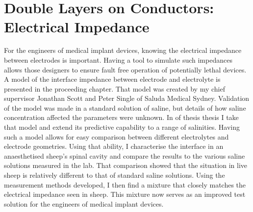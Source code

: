 %
%     
%
%     
%
%     



\part{Double Layers on Conductors: Electrical Impedance}
  \label{part:doubleLayersOnConductors}

  For the engineers of medical implant devices, knowing the electrical impedance between electrodes is important.
  Having a tool to simulate such impedances allows those designers to ensure fault free operation of potentially lethal devices.
  A model of the interface impedance between electrode and electrolyte is presented in the proceeding chapter.
  That model was created by my chief supervisor Jonathan Scott and Peter Single of Saluda Medical Sydney.
  Validation of the model was made in a standard solution of saline, but details of how saline concentration affected the parameters were unknown.
  In \cref{part:doubleLayersOnConductors} of thesis thesis I take that model and extend its predictive capability to a range of salinities.
  Having such a model allows for easy comparison between different electrolytes and electrode geometries.
  Using that ability, I characterise the interface in an anaesthetised sheep's spinal cavity and compare the results to the various saline solutions measured in the lab.
  That comparison showed that the situation in live sheep is relatively different to that of standard saline solutions.
  Using the measurement methods developed, I then find a mixture that closely matches the electrical impedance seen in sheep.
  This mixture now serves as an improved test solution for the engineers of medical implant devices.

